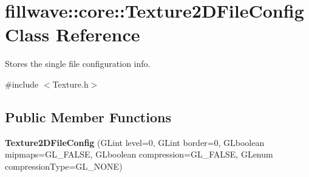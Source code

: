 \hypertarget{classfillwave_1_1core_1_1Texture2DFileConfig}{}\section{fillwave\+:\+:core\+:\+:Texture2\+D\+File\+Config Class Reference}
\label{classfillwave_1_1core_1_1Texture2DFileConfig}


Stores the single file configuration info.  




{\ttfamily \#include $<$Texture.\+h$>$}

\subsection*{Public Member Functions}
\begin{DoxyCompactItemize}
\item 
\hypertarget{classfillwave_1_1core_1_1Texture2DFileConfig_a77fb82f781f164987d1c24818d80b6fa}{}{\bfseries Texture2\+D\+File\+Config} (G\+Lint level=0, G\+Lint border=0, G\+Lboolean mipmaps=G\+L\+\_\+\+F\+A\+L\+S\+E, G\+Lboolean compression=G\+L\+\_\+\+F\+A\+L\+S\+E, G\+Lenum compression\+Type=G\+L\+\_\+\+N\+O\+N\+E)\label{classfillwave_1_1core_1_1Texture2DFileConfig_a77fb82f781f164987d1c24818d80b6fa}

\end{DoxyCompactItemize}

